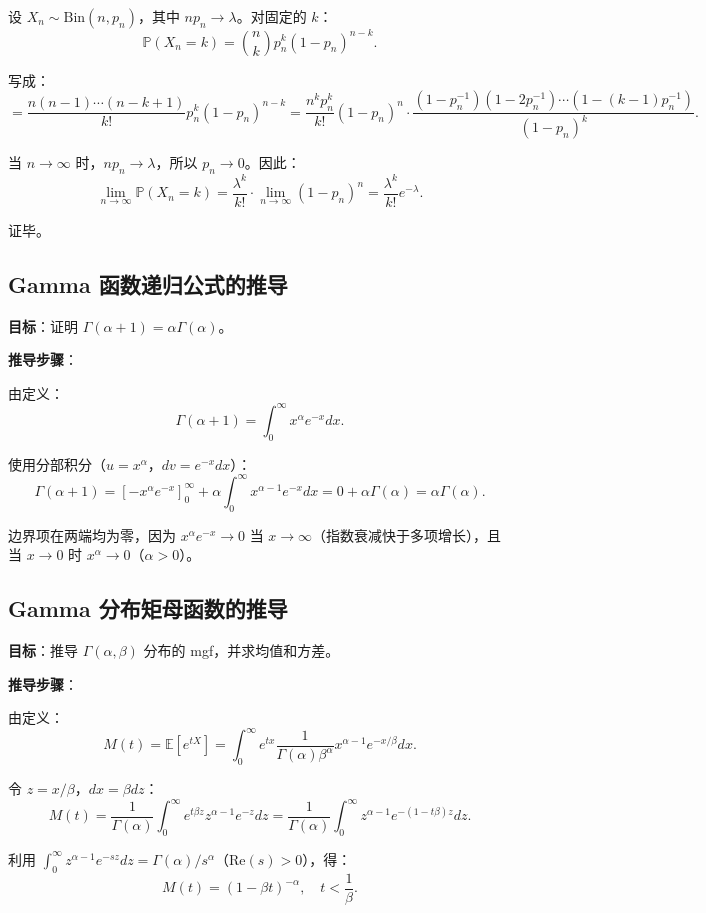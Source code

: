 设 $X_n \sim \text{Bin}(n, p_n)$，其中 $np_n \to \lambda$。对固定的 $k$：
\[
\mathbb{P}(X_n = k) = \binom{n}{k} p_n^{k} (1-p_n)^{n-k}.
\]

写成：
\[
= \frac{n(n-1)\cdots(n-k+1)}{k!} p_n^{k} (1-p_n)^{n-k} = \frac{n^{k}p_n^{k}}{k!} (1-p_n)^{n} \cdot \frac{(1-p_n^{-1})(1-2p_n^{-1})\cdots(1-(k-1)p_n^{-1})}{(1-p_n)^{k}}.
\]

当 $n \to \infty$ 时，$n p_n \to \lambda$，所以 $p_n \to 0$。因此：
\[
\lim_{n\to\infty} \mathbb{P}(X_n = k) = \frac{\lambda^{k}}{k!} \cdot \lim_{n\to\infty} (1-p_n)^{n} = \frac{\lambda^{k}}{k!} e^{-\lambda}.
\]

证毕。

\subsection{Gamma 函数递归公式的推导}\label{sec:derivation-gamma-function}

\textbf{目标}：证明 $\Gamma(\alpha+1) = \alpha\Gamma(\alpha)$。

\textbf{推导步骤}：

由定义：
\[
\Gamma(\alpha+1) = \int_{0}^{\infty} x^{\alpha} e^{-x} dx.
\]

使用分部积分（$u = x^{\alpha}$，$dv = e^{-x}dx$）：
\[
\Gamma(\alpha+1) = \left[-x^{\alpha} e^{-x}\right]_{0}^{\infty} + \alpha \int_{0}^{\infty} x^{\alpha-1} e^{-x} dx = 0 + \alpha\Gamma(\alpha) = \alpha\Gamma(\alpha).
\]

边界项在两端均为零，因为 $x^{\alpha} e^{-x} \to 0$ 当 $x \to \infty$（指数衰减快于多项增长），且当 $x \to 0$ 时 $x^{\alpha} \to 0$（$\alpha > 0$）。

\subsection{Gamma 分布矩母函数的推导}\label{sec:derivation-gamma-mgf}

\textbf{目标}：推导 $\Gamma(\alpha, \beta)$ 分布的 mgf，并求均值和方差。

\textbf{推导步骤}：

由定义：
\[
M(t) = \mathbb{E}[e^{tX}] = \int_{0}^{\infty} e^{tx} \frac{1}{\Gamma(\alpha)\beta^{\alpha}} x^{\alpha-1} e^{-x/\beta} dx.
\]

令 $z = x/\beta$，$dx = \beta dz$：
\[
M(t) = \frac{1}{\Gamma(\alpha)} \int_{0}^{\infty} e^{t\beta z} z^{\alpha-1} e^{-z} dz = \frac{1}{\Gamma(\alpha)} \int_{0}^{\infty} z^{\alpha-1} e^{-(1-t\beta)z} dz.
\]

利用 $\int_{0}^{\infty} z^{\alpha-1} e^{-sz} dz = \Gamma(\alpha)/s^{\alpha}$（$\text{Re}(s) > 0$），得：
\[
M(t) = (1 - \beta t)^{-\alpha}, \quad t < \frac{1}{\beta}.
\]

